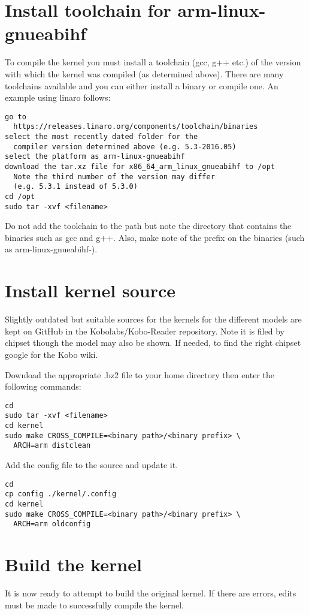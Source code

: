 \section{Install toolchain for arm-linux-gnueabihf}
To compile the kernel you must install a toolchain (gcc, g++ etc.) of the version with
which the kernel was compiled (as determined above).  There are many toolchains available
and you can either install a binary or compile one.  An example using linaro follows:

\begin{verbatim}
go to 
  https://releases.linaro.org/components/toolchain/binaries
select the most recently dated folder for the 
  compiler version determined above (e.g. 5.3-2016.05)
select the platform as arm-linux-gnueabihf
download the tar.xz file for x86_64_arm_linux_gnueabihf to /opt
  Note the third number of the version may differ
  (e.g. 5.3.1 instead of 5.3.0)
cd /opt
sudo tar -xvf <filename>
\end{verbatim}

Do not add the toolchain to the path but note the directory that contains the binaries such as
gcc and g++.  Also, make note of the prefix on the binaries (such as arm-linux-gnueabihf-).

\section{Install kernel source}
Slightly outdated but suitable sources for the kernels for the different models are kept
on GitHub in the Kobolabs/Kobo-Reader repository.  Note it is filed by chipset though the
model may also be shown.  If needed, to find the right chipset google for the Kobo wiki.

Download the appropriate .bz2 file to your home directory then enter the following commands:

\begin{verbatim}
cd
sudo tar -xvf <filename>
cd kernel
sudo make CROSS_COMPILE=<binary path>/<binary prefix> \
  ARCH=arm distclean
\end{verbatim}

Add the config file to the source and update it.

\begin{verbatim}
cd
cp config ./kernel/.config
cd kernel
sudo make CROSS_COMPILE=<binary path>/<binary prefix> \
  ARCH=arm oldconfig
\end{verbatim}

\section{Build the kernel}
It is now ready to attempt to build the original kernel.
If there are errors, edits must be made to
successfully compile the kernel.

